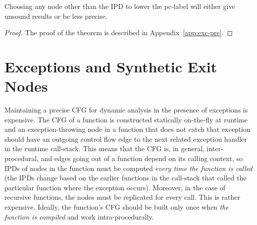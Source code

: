 \begin{myThm}[Precision]\label{thm1:exc}
Choosing any node other than the IPD to lower the pc-label will either
give unsound results or be less precise.
\end{myThm}
\begin{proof}
The proof of the theorem is described in Appendix~\ref{app:exc-pre}.
\end{proof}

\section{Exceptions and Synthetic Exit Nodes}
\label{sec:excsen}
Maintaining a precise CFG for dynamic analysis in the presence of
exceptions is expensive. The CFG of a function is constructed
statically on-the-fly at runtime and an  exception-throwing node in a
function that does not catch that exception should have an outgoing
control flow edge to the next related exception handler in the runtime
call-stack. This means that the CFG is, in general, inter-procedural,
and edges going out of a function depend on its calling context, so
IPDs of nodes in the function must be computed \emph{every time the
  function is called} (the IPDs change based on the earlier functions
in the call-stack that called the particular function where the
exception occurs). Moreover, in the case of recursive functions, the
nodes must be replicated for every call. This is rather
expensive. Ideally, the function's CFG should be built only once when
\emph{the function is compiled} and work intra-procedurally. 

